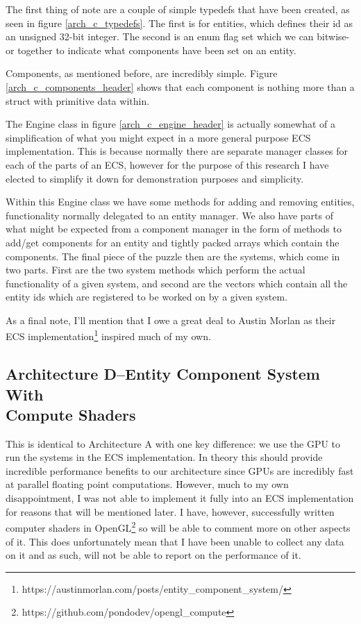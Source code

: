 \documentclass{article}
\begin{document}
The first thing of note are a couple of simple typedefs that have been created,
as seen in figure \ref{arch_c_typedefs}. The first is for entities, which
defines their id as an unsigned 32-bit integer. The second is an enum flag set
which we can bitwise-or together to indicate what components have been set on an
entity.

Components, as mentioned before, are incredibly simple. Figure
\ref{arch_c_components_header} shows that each component is nothing more than a
struct with primitive data within.

The Engine class in figure \ref{arch_c_engine_header} is actually somewhat of a
simplification of what you might expect in a more general purpose ECS
implementation. This is because normally there are separate manager classes for
each of the parts of an ECS, however for the purpose of this research I have
elected to simplify it down for demonstration purposes and simplicity.

Within this Engine class we have some methods for adding and removing entities,
functionality normally delegated to an entity manager. We also have parts of
what might be expected from a component manager in the form of methods to
add/get components for an entity and tightly packed arrays which contain the
components. The final piece of the puzzle then are the systems, which come in
two parts. First are the two system methods which perform the actual
functionality of a given system, and second are the vectors which contain all
the entity ids which are registered to be worked on by a given system.

As a final note, I'll mention that I owe a great deal to Austin Morlan as their
ECS implementation\footnote{https://austinmorlan.com/posts/entity\_component\_system/}
inspired much of my own.

\subsection{Architecture D--Entity Component System With\\Compute Shaders}
This is identical to Architecture A with one key difference: we use the GPU to
run the systems in the ECS implementation. In theory this should provide
incredible performance benefits to our architecture since GPUs are incredibly
fast at parallel floating point computations. However, much to my own 
disappointment, I was not able to implement it fully into an ECS implementation
for reasons that will be mentioned later. I have, however, successfully written
computer shaders in OpenGL\footnote{https://github.com/pondodev/opengl\_compute}
so will be able to comment more on other aspects of it. This does unfortunately
mean that I have been unable to collect any data on it and as such, will not be
able to report on the performance of it.
\end{document}
